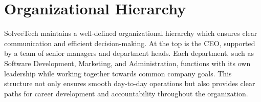 \section{Organizational Hierarchy}
SolveeTech maintains a well-defined organizational hierarchy which ensures clear communication and efficient decision-making. At the top is the CEO, supported by a team of senior managers and department heads. Each department, such as Software Development, Marketing, and Administration, functions with its own leadership while working together towards common company goals. This structure not only ensures smooth day-to-day operations but also provides clear paths for career development and accountability throughout the organization.

